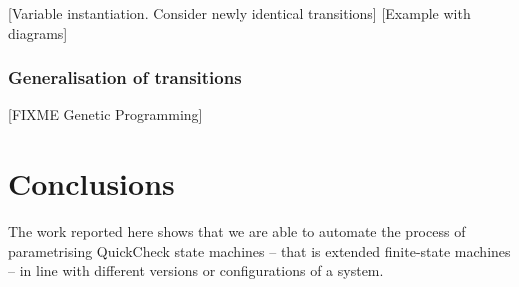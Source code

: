 [Variable instantiation. Consider newly identical transitions]
[Example with diagrams]

\subsubsection{Generalisation of transitions}
\label{Generalisation}

[FIXME Genetic Programming]


\section{Conclusions}
\label{concs}

The work reported here shows that we are able to automate the process of parametrising QuickCheck state machines -- that 
is extended finite-state machines -- in line with different versions or configurations of a system.

